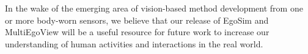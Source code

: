 
In the wake of the emerging area of vision-based method development from one or more body-worn sensors, we believe that our release of EgoSim and MultiEgoView will be a useful resource for future work to increase our understanding of human activities and interactions in the real world.
